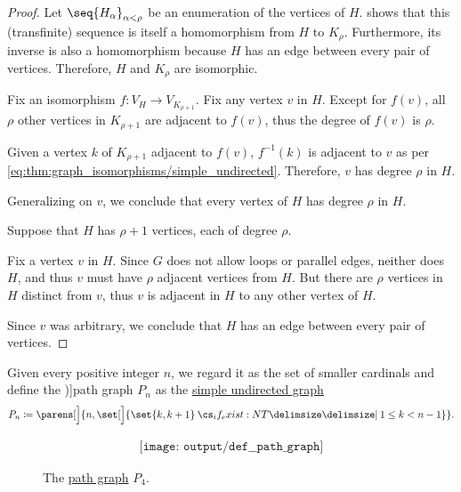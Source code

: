 \begin{proof}
   Let \( \seq{ H_\alpha }_{\alpha < \rho} \) be an enumeration of the vertices of \( H \).  shows that this (transfinite) sequence is itself a homomorphism from \( H \) to \( K_\rho \). Furthermore, its inverse is also a homomorphism because \( H \) has an edge between every pair of vertices. Therefore, \( H \) and \( K_\rho \) are isomorphic.

   Fix an isomorphism \( f: V_H \to V_{K_{\rho + 1}} \). Fix any vertex \( v \) in \( H \). Except for \( f(v) \), all \( \rho \) other vertices in \( K_{\rho + 1} \) are adjacent to \( f(v) \), thus the degree of \( f(v) \) is \( \rho \).

  Given a vertex \( k \) of \( K_{\rho + 1} \) adjacent to \( f(v) \), \( f^{-1}(k) \) is adjacent to \( v \) as per \eqref{eq:thm:graph_isomorphisms/simple_undirected}. Therefore, \( v \) has degree \( \rho \) in \( H \).

  Generalizing on \( v \), we conclude that every vertex of \( H \) has degree \( \rho \) in \( H \).

   Suppose that \( H \) has \( \rho + 1 \) vertices, each of degree \( \rho \).

  Fix a vertex \( v \) in \( H \). Since \( G \) does not allow loops or parallel edges, neither does \( H \), and thus \( v \) must have \( \rho \) adjacent vertices from \( H \). But there are \( \rho \) vertices in \( H \) distinct from \( v \), thus \( v \) is adjacent in \( H \) to any other vertex of \( H \).

  Since \( v \) was arbitrary, we conclude that \( H \) has an edge between every pair of vertices.
\end{proof}

\begin{definition}\label{def:path_graph}
  Given every positive integer \( n \), we regard it as the set of smaller cardinals and define the \term[en=path (\cite[4]{Bollobás1998ModernGraphTheory})]{path graph} \( P_n \) as the \hyperref[def:undirected_graph]{simple undirected graph}
  \begin{equation*}
    P_n \coloneqq \parens[\Big]{ n, \set[\Big]{ \set{ k, k + 1 } \given* 1 \leq k < n - 1 } }.
  \end{equation*}

  \begin{figure}[!ht]
    \begin{equation}\label{eq:fig:def:path_graph/p4}
      \begin{aligned}
        \texttt{[image: output/def\_\_path\_graph]}
      \end{aligned}
    \end{equation}
    \caption{The \hyperref[def:path_graph]{path graph} \( P_4 \).}\label{fig:def:path_graph/p4}
  \end{figure}
\end{definition}

